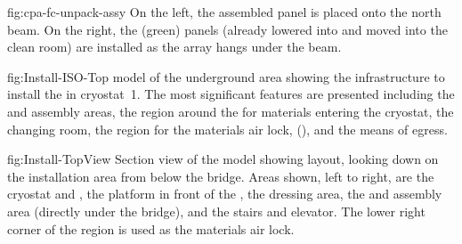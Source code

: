 \begin{dunefigure}{fig:cpa-fc-unpack-assy}
  {On the left, the assembled  panel is placed onto the north  beam. On the right, the (green)  panels (already lowered into  and moved into the clean room) are installed as the  array hangs under the  beam. }
\end{dunefigure}

\begin{dunefigure}{fig:Install-ISO-Top}
  {\threed model of the underground area showing the infrastructure to install the  in cryostat~1. The most significant features are presented including the  and  assembly areas, the region around the  for materials entering the cryostat,  the changing room, the region for the materials air lock, (), 
  and the means of egress.}
\end{dunefigure}

\begin{dunefigure}{fig:Install-TopView}
  {Section view of the \threed model showing layout, looking down on the installation area from below the bridge. Areas shown, left to right,  are the cryostat and , the platform in front of the , the dressing area, the  and  assembly area (directly under the bridge), and the stairs and elevator. The lower right corner of the region is used as the materials air lock.}
\end{dunefigure}





